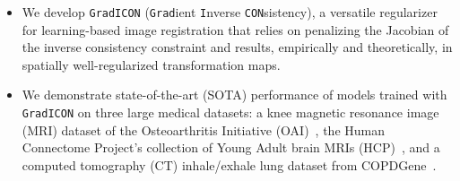 \begin{itemize}
	\item We develop \texttt{GradICON} ({\texttt{Grad}}ient {\texttt{I}}nverse
	      {\texttt{CON}}sistency), a versatile regularizer for learning-based image
	      registration that relies on penalizing the Jacobian of the inverse consistency
	      constraint and results, empirically and theoretically, in spatially
	      well-regularized transformation maps. \vspace{-0.1cm}
	\item We demonstrate state-of-the-art (SOTA) performance of models trained with
	      \texttt{GradICON} on three large medical datasets: a knee magnetic resonance
	      image (MRI) dataset of the Osteoarthritis Initiative
	      (OAI)~\cite{nevitt2006osteoarthritis}, the Human Connectome Project's
	      collection of Young Adult brain MRIs (HCP)~\cite{van2012human}, and a computed
	      tomography (CT) inhale/exhale lung dataset from
	      COPDGene~\cite{regan2011genetic}. %
\end{itemize}

\vspace{-0.15cm}

